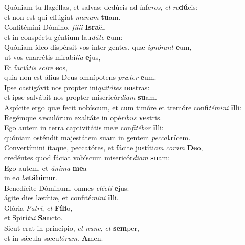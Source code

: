 \evenverse Quóniam tu flagéllas, et salvas: dedúcis ad ínfe\textit{ros}, \textit{et} \textit{re}\textbf{dú}cis:~\*\\
\evenverse et non est qui effúgiat \textit{ma}\textit{num} \textbf{tu}am.\\
\oddverse Confitémini Dómino, \textit{fí}\textit{li}\textit{i} \textbf{Is}\textbf{ra}ël,~\*\\
\oddverse et in conspéctu géntium lau\textit{dá}\textit{te} \textbf{e}um:\\
\evenverse Quóniam ídeo dispérsit vos inter gentes, quæ \textit{i}\textit{gnó}\textit{rant} \textbf{e}um,~\*\\
\evenverse ut vos enarrétis mirabí\textit{li}\textit{a} \textbf{e}jus,\\
\oddverse Et faciá\textit{tis} \textit{sci}\textit{re} \textbf{e}os,~\*\\
\oddverse quia non est álius Deus omnípotens \textit{præ}\textit{ter} \textbf{e}um.\\
\evenverse Ipse castigávit nos propter ini\textit{qui}\textit{tá}\textit{tes} \textbf{no}stras:~\*\\
\evenverse et ipse salvábit nos propter misericór\textit{di}\textit{am} \textbf{su}am.\\
\oddverse Aspícite ergo quæ fecit nobíscum, et cum timóre et tremóre confi\textit{té}\textit{mi}\textit{ni} \textbf{il}li:~\*\\
\oddverse Regémque sæculórum exaltáte in opé\textit{ri}\textit{bus} \textbf{ve}stris.\\
\evenverse Ego autem in terra captivitátis meæ con\textit{fi}\textit{té}\textit{bor} \textbf{il}li:~\*\\
\evenverse quóniam osténdit majestátem suam in gentem \textit{pec}\textit{ca}\textbf{trí}cem.\\
\oddverse Convertímini ítaque, peccatóres, et fácite justíti\textit{am} \textit{co}\textit{ram} \textbf{De}o,~\*\\
\oddverse credéntes quod fáciat vobíscum misericór\textit{di}\textit{am} \textbf{su}am:\\
\evenverse Ego autem, et \textit{á}\textit{ni}\textit{ma} \textbf{me}a~\*\\
\evenverse in e\textit{o} \textit{læ}\textbf{tá}\textbf{bi}mur.\\
\oddverse Benedícite Dóminum, omnes \textit{e}\textit{lé}\textit{cti} \textbf{e}jus:~\*\\
\oddverse ágite dies lætítiæ, et confité\textit{mi}\textit{ni} \textbf{il}li.\\
\evenverse Glória \textit{Pa}\textit{tri}, \textit{et} \textbf{Fí}\textbf{li}o,~\*\\
\evenverse et Spirí\textit{tu}\textit{i} \textbf{San}cto.\\
\oddverse Sicut erat in princípio, \textit{et} \textit{nunc}, \textit{et} \textbf{sem}per,~\*\\
\oddverse et in sǽcula sæcu\textit{ló}\textit{rum}. \textbf{A}men.\\
